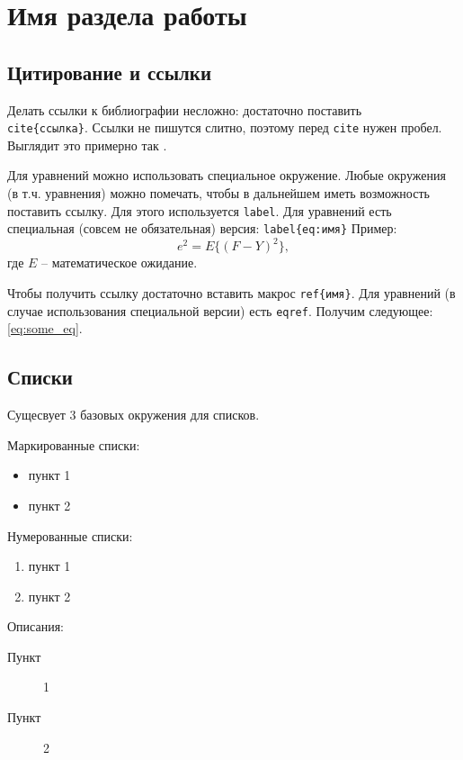 
\section{Имя раздела работы}

\subsection{Цитирование и ссылки}
Делать ссылки к библиографии несложно: достаточно поставить \texttt{\\cite\{ссылка\}}. Ссылки не пишутся слитно, поэтому перед \texttt{cite} нужен пробел. Выглядит это примерно так \cite{test}.

Для уравнений можно использовать специальное окружение. Любые окружения (в т.ч. уравнения) можно помечать, чтобы в дальнейшем иметь возможность поставить ссылку. Для этого используется \texttt{label}. Для уравнений есть специальная (совсем не обязательная) версия: \texttt{label\{eq:имя\}} Пример:
\begin{equation}\label{eq:some_eq}
	e^2 = E\{(F - Y)^2\},
\end{equation}
где $E$ -- математическое ожидание.

Чтобы получить ссылку достаточно вставить макрос \texttt{ref\{имя\}}. Для уравнений (в случае использования специальной версии) есть \texttt{eqref}. Получим следующее: \eqref{eq:some_eq}.

\subsection{Списки}

Сущесвует 3 базовых окружения для списков.

Маркированные списки:
\begin{itemize}
	\item пункт 1
	\item пункт 2
\end{itemize}

Нумерованные списки:
\begin{enumerate}
	\item пункт 1
	\item пункт 2
\end{enumerate}

Описания:
\begin{description}
	\item[Пункт] 1
	\item[Пункт] 2
\end{description}

